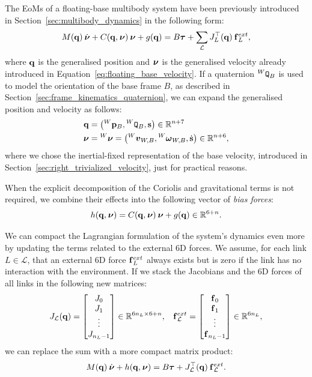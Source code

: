The \acp{EoM} of a floating-base multibody system have been previously introduced in Section~\ref{sec:multibody_dynamics} in the following form:
%
\begin{equation*}
    M(\Qu) \Nud + C(\Qu, \Nu) \Nu + g(\Qu) = B \Torques + \sum_{\mathcal{L}} J_{L}^\top(\Qu) \forcesix_L^{ext}
    ,
\end{equation*}
%
where $\Qu$ is the generalised position and $\Nu$ is the generalised velocity already introduced in Equation~\eqref{eq:floating_base_velocity}.
%
If a quaternion $\quat[W]_B$ is used to model the orientation of the base frame $B$, as described in Section~\ref{sec:frame_kinematics_quaternion}, we can expand the generalised position and velocity as follows:
%
\begin{align}
    \label{eq:qu_nu_quaternion}
    \mathbf{q} &= \left( \pos[W]_B,  \quat[W]_B, \mathbf{s} \right) \in \mathbb{R}^{n+7} \\
    \boldsymbol{\nu} &= \Nu[W] = \left( \vellin[W]_{W,B}, \velang[W]_{W,B}, \dot{\mathbf{s}} \right) \in \mathbb{R}^{n+6}
    ,
\end{align}
%
where we chose the inertial-fixed representation of the base velocity, introduced in Section~\ref{sec:right_trivialized_velocity}, just for practical reasons.

When the explicit decomposition of the Coriolis and gravitational terms is not required, we combine their effects into the following vector of \emph{bias forces}:
%
\begin{equation*}
    h(\Qu, \Nu) = C(\Qu, \Nu) \Nu + g(\Qu) \in \realn^{6+n}
    .
\end{equation*}

We can compact the Lagrangian formulation of the system's dynamics even more by updating the terms related to the external 6D forces.
We assume, for each link $L \in \mathcal{L}$, that an external 6D force $\forcesix^{ext}_L$ always exists but is zero if the link has no interaction with the environment.
If we stack the Jacobians and the 6D forces of all links in the following new matrices:
%
\begin{align*}
    J_\mathcal{L}(\Qu) = 
    \begin{bmatrix}
        J_0 \\
        J_1 \\
        \vdots \\
        J_{n_L - 1}
    \end{bmatrix} \in \mathbb{R}^{6 n_L \times 6+n},
    && 
    \forcesix^{ext}_\mathcal{L} = 
    \begin{bmatrix}
        \forcesix_0 \\
        \forcesix_1 \\
        \vdots \\
        \forcesix_{n_L - 1}
    \end{bmatrix} \in \mathbb{R}^{6 n_L}
    ,
\end{align*}
%
we can replace the sum with a more compact matrix product:
%
\begin{equation}
    \label{eq:eom_multibody_compact}
    M(\Qu) \Nud + h(\Qu, \Nu) = B \Torques + J_\mathcal{L}^\top(\Qu) \forcesix^{ext}_\mathcal{L}
    .
\end{equation}


